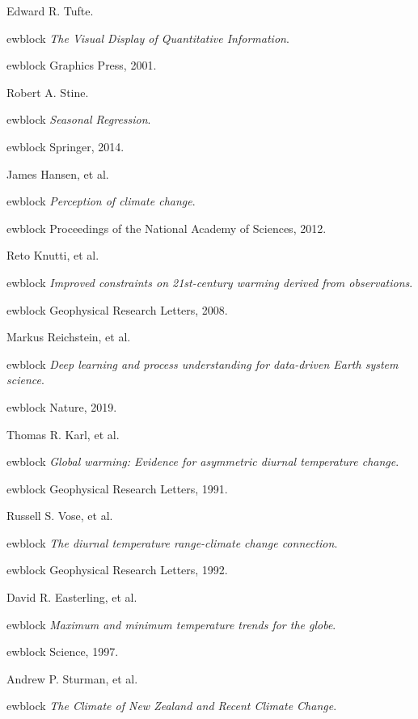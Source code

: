 \documentclass{article}
\begin{document}
\begin{thebibliography}{10}

Edward R. Tufte.

ewblock {\em The Visual Display of Quantitative Information}.

ewblock Graphics Press, 2001.

Robert A. Stine.

ewblock {\em Seasonal Regression}.

ewblock Springer, 2014.

James Hansen, et al.

ewblock {\em Perception of climate change}.

ewblock Proceedings of the National Academy of Sciences, 2012.

Reto Knutti, et al.

ewblock {\em Improved constraints on 21st-century warming derived from observations}.

ewblock Geophysical Research Letters, 2008.

Markus Reichstein, et al.

ewblock {\em Deep learning and process understanding for data-driven Earth system science}.

ewblock Nature, 2019.

Thomas R. Karl, et al.

ewblock {\em Global warming: Evidence for asymmetric diurnal temperature change}.

ewblock Geophysical Research Letters, 1991.

Russell S. Vose, et al.

ewblock {\em The diurnal temperature range-climate change connection}.

ewblock Geophysical Research Letters, 1992.

David R. Easterling, et al.

ewblock {\em Maximum and minimum temperature trends for the globe}.

ewblock Science, 1997.

Andrew P. Sturman, et al.

ewblock {\em The Climate of New Zealand and Recent Climate Change}.


\end{thebibliography}
\end{document}

